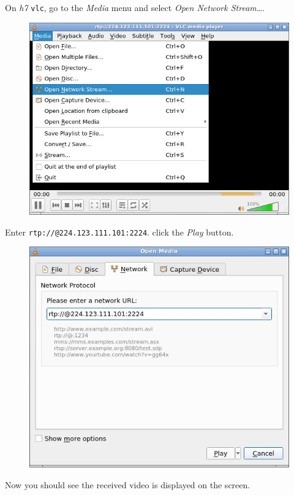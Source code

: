 \documentclass{../UTNetLab}
\begin{document}
    On \textit{h7} \lstinline{vlc},
    go to the \textit{Media} menu and select \textit{Open Network Stream\ldots}.
    \begin{figure}[H]
        \centering
        \includegraphics[scale=1.6]{img/open-network}
    \end{figure}
    Enter \texttt{rtp://@224.123.111.101:2224}.
    click the \textit{Play} button.
    \begin{figure}[H]
        \centering
        \includegraphics[scale=1.6]{img/network}
    \end{figure}

    Now you should see the received video is displayed on the screen. 
\end{document}
